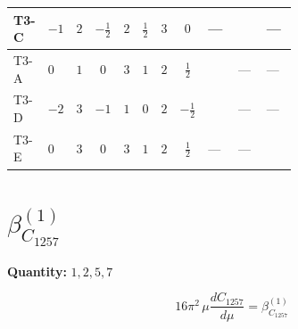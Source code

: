 \documentclass[8pt]{article}
\begin{document}
\begin{landscape}
\begin{longtable}{@{}llcccccc >{\raggedright\arraybackslash}p{0.21\linewidth} >{\raggedright\arraybackslash}p{0.21\linewidth} >{\raggedright\arraybackslash}p{0.21\linewidth}@{}}
\midrule
T3-C & $-1$ & $2$ & $-\frac{1}{2}$ & $2$ & $\frac{1}{2}$ & $3$ & $0$ & --- & \scriptsize\adjustbox{max width=\linewidth}{$\begin{gathered} - \frac{lambdaT_{3} \overline{y_{1}} \overline{y_{2}}}{3 MF}\end{gathered}$} & --- \\
\midrule
T3-A & $0$ & $1$ & $0$ & $3$ & $1$ & $2$ & $\frac{1}{2}$ & \scriptsize\adjustbox{max width=\linewidth}{$\begin{gathered} \frac{\sqrt{3} lambdaT_{3} \overline{y_{1}} \overline{y_{2}}}{3 MF}\end{gathered}$} & --- & --- \\
\midrule
T3-D & $-2$ & $3$ & $-1$ & $1$ & $0$ & $2$ & $-\frac{1}{2}$ & \scriptsize\adjustbox{max width=\linewidth}{$\begin{gathered} \frac{\sqrt{3} lambdaT_{3} \overline{y_{1}} \overline{y_{2}}}{3 MF}\end{gathered}$} & --- & --- \\
\midrule
T3-E & $0$ & $3$ & $0$ & $3$ & $1$ & $2$ & $\frac{1}{2}$ & --- & --- & \scriptsize\adjustbox{max width=\linewidth}{$\begin{gathered} - \frac{\sqrt{6} lambdaT_{3} \overline{y_{1}} \overline{y_{2}}}{3 MF}\end{gathered}$} \\
\midrule
\bottomrule
\end{longtable}
\clearpage
\section*{$\beta_{C_{1257}}^{(1)}$}
\noindent\textbf{Quantity: }$\mathrm{1,2,5,7}$\par\smallskip
\[16\pi^2\,\mu\frac{d C_{1257}}{d\mu}=\beta_{C_{1257}}^{(1)}\]

\end{landscape}
\end{document}
